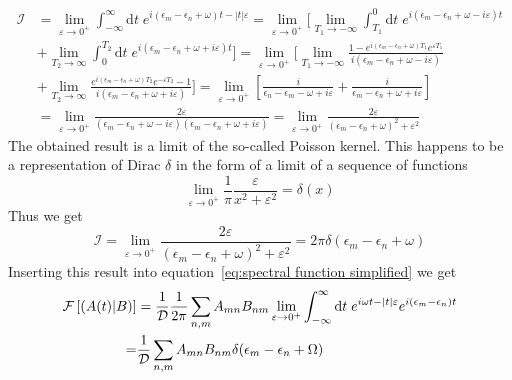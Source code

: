 \begin{align}
\mathcal{I} &= \lim _{\varepsilon \to 0^+} \int_{-\infty}^{\infty} \mathrm{d} t \; 
e^{ i (\epsilon_m-\epsilon_n+\omega)t -|t| \varepsilon} = \lim _{\varepsilon \to 0^+} 
\Bigg[\lim_{T_1\to -\infty}\int_{T_1}^{0} \mathrm{d} t \; e^{ i (\epsilon_m-\epsilon_n+\omega -i \varepsilon)t}\nonumber\\
&+\lim_{T_2\to \infty}\int_{0}^{T_2} \mathrm{d} t \;  e^{ i (\epsilon_m-\epsilon_n+\omega + i\varepsilon)t}\Bigg]
= \lim _{\varepsilon \to 0^+} \Bigg[\lim_{T_1\to -\infty} 
\frac{1-e^{ i (\epsilon_m-\epsilon_n+\omega )T_1} e^{\varepsilon T_1}}{i (\epsilon_m-\epsilon_n+\omega -i \varepsilon)}\nonumber\\
 &+ \lim_{T_2\to \infty} \frac{e^{ i (\epsilon_m-\epsilon_n+\omega )T_2} e^{-\varepsilon T_2}-1}
{i (\epsilon_m-\epsilon_n+\omega +i \varepsilon)}\Bigg]
= \lim _{\varepsilon \to 0^+} \left[\frac{i}{\epsilon_n-\epsilon_m-\omega +i \varepsilon} + 
\frac{i}{\epsilon_m-\epsilon_n+\omega +i \varepsilon} \right]\nonumber\\
 &= \lim _{\varepsilon \to 0^+}
\frac{2\varepsilon}{(\epsilon_m-\epsilon_n+\omega -i \varepsilon)(\epsilon_m-\epsilon_n+\omega +i \varepsilon)}
=\lim _{\varepsilon \to 0^+} \frac{2\varepsilon}{(\epsilon_m-\epsilon_n+\omega)^2 +\varepsilon^2}
\end{align}
The obtained result is a limit of the so-called Poisson kernel. This happens to be
a representation of Dirac \(\delta\) in the form of a limit of a sequence of functions~\autocite{byron1992mathematics}
\begin{equation}
\lim _{\varepsilon \to 0^+} \frac{1}{\pi} \frac{\varepsilon}{x^2 +\varepsilon^2} = \delta(x) 
\end{equation}
Thus we get
\begin{equation}
\mathcal{I} = \lim _{\varepsilon \to 0^+} \frac{2\varepsilon}{(\epsilon_m-\epsilon_n+\omega)^2 +\varepsilon^2}
= 2\pi \delta(\epsilon_m-\epsilon_n+\omega)
\end{equation}
Inserting this result into equation~\eqref{eq:spectral function simplified} we get
\begin{align}
\mathcal{F}\left[\left(A(t) \middle| B\right)\right] &= \frac{1}{\mathcal{D}} \frac{1}{2 \pi}\sum_{n,m} A_{mn} B_{nm}  
\lim _{\varepsilon \to 0^+} \int_{-\infty}^{\infty} \mathrm{d} t \; e^{i \omega t-|t| 
\varepsilon}e^{i (\epsilon_m-\epsilon_n) t} \nonumber\\
=& \frac{1}{\mathcal{D}}\sum_{n,m} A_{mn} B_{nm} \delta(\epsilon_m-\epsilon_n+\Omega)
\end{align}
